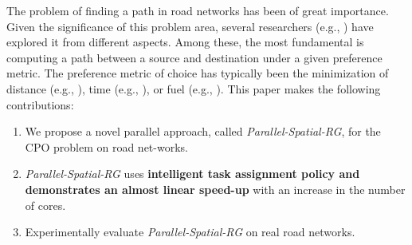The problem of finding a path in road networks has been of great importance. Given the significance of this problem area, several researchers (e.g., \cite{V_T_Chakaravarthy, Ugur_Demiryurek}) have explored it from different aspects. Among these, the most fundamental is computing a path between a source and destination under a given preference metric. The preference metric of choice has typically been the minimization of distance (e.g., \cite{Sibo_Wang}), time (e.g., \cite{Ugur_Demiryurek}), or fuel (e.g., \cite{Yan_Li}). This paper makes the following contributions:
\begin{enumerate}
    \item We propose a novel parallel approach, called \textit{Parallel-Spatial-RG}, for the CPO problem on road net-works.
    \item \textit{Parallel-Spatial-RG} uses \textbf{intelligent task assignment policy and demonstrates an almost linear speed-up} with an increase in the number of cores.
    \item Experimentally evaluate \textit{Parallel-Spatial-RG} on real road networks.
\end{enumerate}